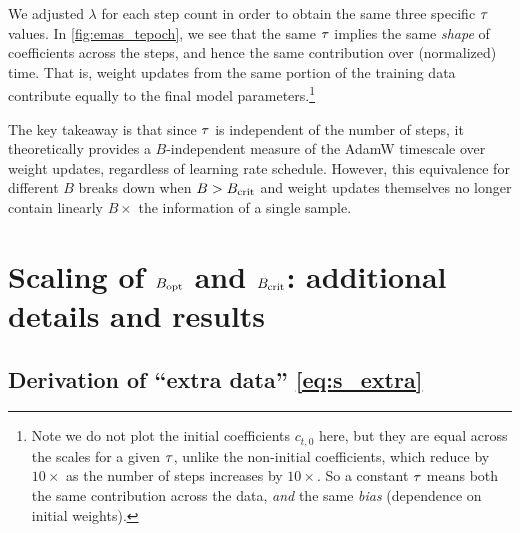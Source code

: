 We adjusted $\lambda$ for each step count in order to obtain the same
three specific $\tau$ values.  In \cref{fig:emas_tepoch}, we see
that the same $\tau$ implies the same \emph{shape} of coefficients
across the steps, and hence the same contribution over (normalized)
time.  That is, weight updates from the same portion of the training
data contribute equally to the final model parameters.\footnote{Note
we do not plot the initial coefficients $c_{t,0}$ here, but they are
equal across the scales for a given $\tau$, unlike the non-initial
coefficients, which reduce by $10\times$ as the number of steps
increases by $10\times$.  So a constant $\tau$ means both the same
contribution across the data, \emph{and} the same \emph{bias}
(dependence on initial weights).}

The key takeaway is that since $\tau$ is independent of the number
of steps, it theoretically provides a $B$-independent measure of the
AdamW timescale over weight updates, regardless of learning rate
schedule.
%
However, this equivalence for different $B$ breaks down when $B >
B_{\text{crit}}$ and weight updates themselves no longer contain linearly
$B\times$ the information of a single sample.

%

\section{Scaling of $B_{\text{opt}}$ and $B_{\text{crit}}$: additional details and results}

\subsection{Derivation of ``extra data'' \cref{eq:s_extra}}\label{sec:cbs_derivations}


